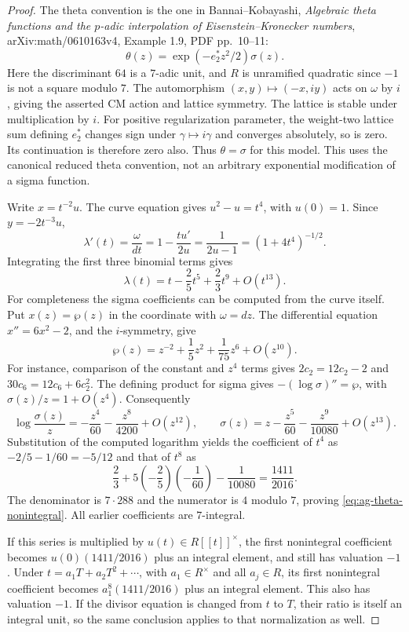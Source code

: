 \documentclass[11pt,a4paper]{article}
\begin{document}
\begin{proof}
The theta convention is the one in Bannai--Kobayashi,
\emph{Algebraic theta functions and the $p$-adic interpolation
of Eisenstein--Kronecker numbers}, arXiv:math/0610163v4,
Example 1.9, PDF pp.~10--11:
\[
 \theta(z)=\exp(-e_2^*z^2/2)\sigma(z).
\]
Here the discriminant $64$ is a $7$-adic unit, and $R$ is
unramified quadratic since $-1$ is not a square modulo $7$.
The automorphism $(x,y)\mapsto(-x,iy)$ acts on $\omega$ by
$i$, giving the asserted CM action and lattice symmetry.
The lattice is stable under multiplication by $i$.
For positive regularization parameter, the weight-two lattice
sum defining $e_2^*$ changes sign under $\gamma\mapsto i\gamma$
and converges absolutely, so is zero. Its continuation is
therefore zero also. Thus $\theta=\sigma$ for this model.
This uses the canonical reduced theta convention, not an
arbitrary exponential modification of a sigma function.

Write $x=t^{-2}u$. The curve equation gives
$u^2-u=t^4$, with $u(0)=1$. Since $y=-2t^{-3}u$,
\[
 \lambda'(t)=\frac{\omega}{dt}
       =1-\frac{tu'}{2u}
       =\frac1{2u-1}
       =(1+4t^4)^{-1/2}.
\]
Integrating the first three binomial terms gives
\[
 \lambda(t)=t-\frac25t^5+\frac23t^9+O(t^{13}).
\]
For completeness the sigma coefficients can be computed from
the curve itself. Put $x(z)=\wp(z)$ in the coordinate with
$\omega=dz$. The differential equation
$x''=6x^2-2$, and the $i$-symmetry, give
\[
 \wp(z)=z^{-2}+\frac15z^2+\frac1{75}z^6+O(z^{10}).
\]
For instance, comparison of the constant and $z^4$ terms
gives $2c_2=12c_2-2$ and
$30c_6=12c_6+6c_2^2$. The defining product for sigma gives
$-(\log\sigma)''=\wp$, with
$\sigma(z)/z=1+O(z^4)$. Consequently
\[
 \log\frac{\sigma(z)}z
      =-\frac{z^4}{60}-\frac{z^8}{4200}+O(z^{12}),
 \qquad
 \sigma(z)=z-\frac{z^5}{60}-\frac{z^9}{10080}+O(z^{13}).
\]
Substitution of the computed logarithm yields the coefficient
of $t^4$ as $-2/5-1/60=-5/12$ and that of $t^8$ as
\[
 \frac23+5\left(-\frac25\right)\left(-\frac1{60}\right)
           -\frac1{10080}=\frac{1411}{2016}.
\]
The denominator is $7\cdot288$ and the numerator is $4$
modulo $7$, proving \eqref{eq:ag-theta-nonintegral}.
All earlier coefficients are $7$-integral.

If this series is multiplied by $u(t)\in R[[t]]^\times$,
the first nonintegral coefficient becomes
$u(0)(1411/2016)$ plus an integral element, and still has
valuation $-1$. Under $t=a_1T+a_2T^2+\cdots$, with
$a_1\in R^\times$ and all $a_j\in R$, its first
nonintegral coefficient becomes
$a_1^8(1411/2016)$ plus an integral element. This also has
valuation $-1$. If the divisor equation is changed from $t$
to $T$, their ratio is itself an integral unit, so the same
conclusion applies to that normalization as well.
\end{proof}
\end{document}
